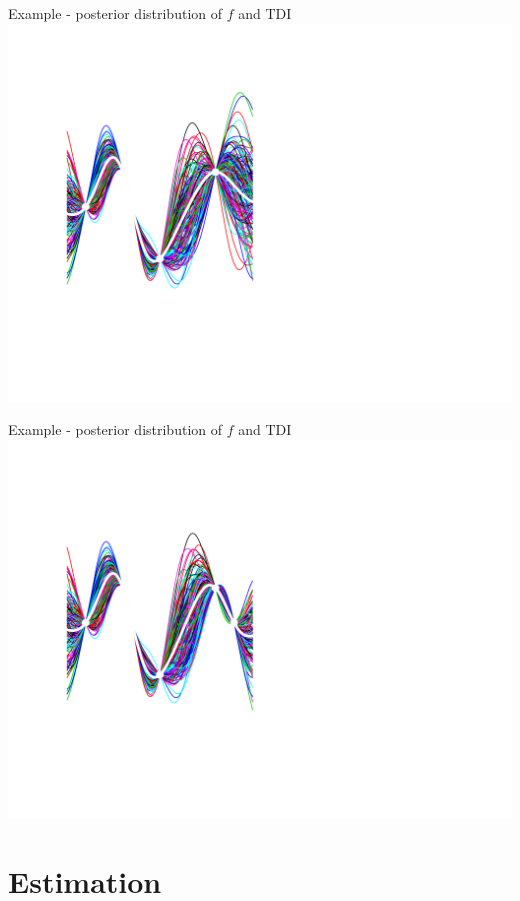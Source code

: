 \documentclass[ignorenonframetext,xcolor=pdflatex,table,dvipsnames,serif]{beamer}
\begin{document}
\begin{frame}{Example - posterior distribution of $f$ and TDI}
  \center\includegraphics[scale=0.5]{probAni05}
\end{frame}
\begin{frame}{Example - posterior distribution of $f$ and TDI}
  \center\includegraphics[scale=0.5]{probAni06}
\end{frame}


\section{Estimation}
\end{document}
